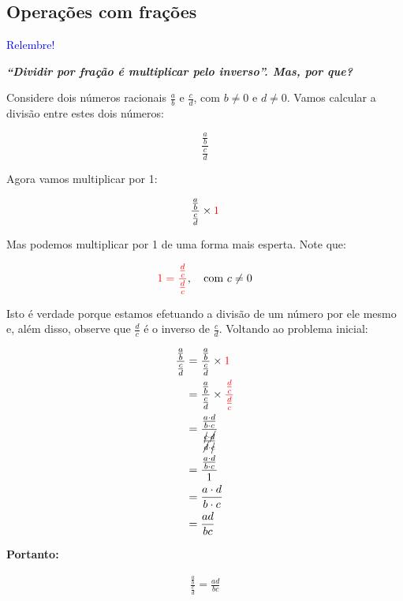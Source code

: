 \documentclass[12pt,openright,twoside,a4paper]{article}
\theoremstyle{definition}
\begin{document}
	\subsection{Operações com frações}
	\begin{snugshade}
		\textcolor{blue}{Relembre!}
		
		\textit{\textbf{``Dividir por fração é multiplicar pelo inverso''. Mas, por que?}}
		
		Considere dois números racionais \( \frac{a}{b} \) e \( \frac{c}{d} \), com \( b \neq 0 \) e \( d \neq 0 \).  
		Vamos calcular a divisão entre estes dois números:
		
		
		
		\[
		\frac{\frac{a}{b}}{\frac{c}{d}}
		\]
		
		
		
		Agora vamos multiplicar por 1:
		
		
		
		\[
		\frac{\frac{a}{b}}{\frac{c}{d}} \times \textcolor{red}{1}
		\]
		
		
		
		Mas podemos multiplicar por 1 de uma forma mais esperta. Note que:
		
		
	\begin{align*}
		\textcolor{red}{1 = \frac{\frac{d}{c}}{\frac{d}{c}}}, \quad \text{com } c \neq 0
	\end{align*}
		
		
		
		Isto é verdade porque estamos efetuando a divisão de um número por ele mesmo e, além disso, observe que \( \frac{d}{c} \) é o inverso de \( \frac{c}{d} \). Voltando ao problema inicial:
		
		
		
		\begin{align*}
			\frac{\frac{a}{b}}{\frac{c}{d}} &= \frac{\frac{a}{b}}{\frac{c}{d}} \times \textcolor{red}{1}\\
			&= \frac{\frac{a}{b}}{\frac{c}{d}} \times \textcolor{red}{\frac{\frac{d}{c}}{\frac{d}{c}}} \\
			&= \frac{\frac{a\cdot d}{b \cdot c}}{\frac{\cancel{c} \cdot \cancel{d}}{\cancel{d} \cdot \cancel{c}}}\\
			&= \frac{\frac{a\cdot d}{b \cdot c}}{1}\\
			&= \frac{a\cdot d}{b \cdot c}\\
			&= \frac{ad}{bc}
		\end{align*}
		
		\textbf{Portanto:}
		
		
		
		\begin{align*}
			\frac{\frac{a}{b}}{\frac{c}{d}} = \frac{ad}{bc}
		\end{align*}
		
	\end{snugshade}
	
\end{document}
